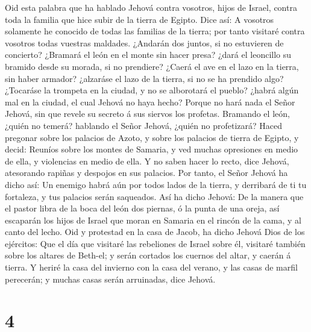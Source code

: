  Oid esta palabra que ha hablado Jehová contra vosotros,
hijos de Israel, contra toda la familia que hice subir de la tierra de
Egipto. Dice así:  A vosotros solamente he conocido de
todas las familias de la tierra; por tanto visitaré contra vosotros
todas vuestras maldades.  ¿Andarán dos juntos, si no
estuvieren de concierto?  ¿Bramará el león en el monte sin
hacer presa? ¿dará el leoncillo su bramido desde su morada, si no
prendiere?  ¿Caerá el ave en el lazo en la tierra, sin
haber armador? ¿alzaráse el lazo de la tierra, si no se ha prendido
algo?  ¿Tocaráse la trompeta en la ciudad, y no se
alborotará el pueblo? ¿habrá algún mal en la ciudad, el cual Jehová no
haya hecho?  Porque no hará nada el Señor Jehová, sin que
revele su secreto á sus siervos los profetas.  Bramando el
león, ¿quién no temerá? hablando el Señor Jehová, ¿quién no profetizará?
 Haced pregonar sobre los palacios de Azoto, y sobre los
palacios de tierra de Egipto, y decid: Reuníos sobre los montes de
Samaria, y ved muchas opresiones en medio de ella, y violencias en medio
de ella.  Y no saben hacer lo recto, dice Jehová,
atesorando rapiñas y despojos en sus palacios.  Por
tanto, el Señor Jehová ha dicho así: Un enemigo habrá aún por todos
lados de la tierra, y derribará de ti tu fortaleza, y tus palacios serán
saqueados.  Así ha dicho Jehová: De la manera que el
pastor libra de la boca del león dos piernas, ó la punta de una oreja,
así escaparán los hijos de Israel que moran en Samaria en el rincón de
la cama, y al canto del lecho.  Oid y protestad en la
casa de Jacob, ha dicho Jehová Dios de los ejércitos: 
Que el día que visitaré las rebeliones de Israel sobre él, visitaré
también sobre los altares de Beth-el; y serán cortados los cuernos del
altar, y caerán á tierra.  Y heriré la casa del invierno
con la casa del verano, y las casas de marfil perecerán; y muchas casas
serán arruinadas, dice Jehová.

\hypertarget{section-3}{%
\section{4}\label{section-3}}

